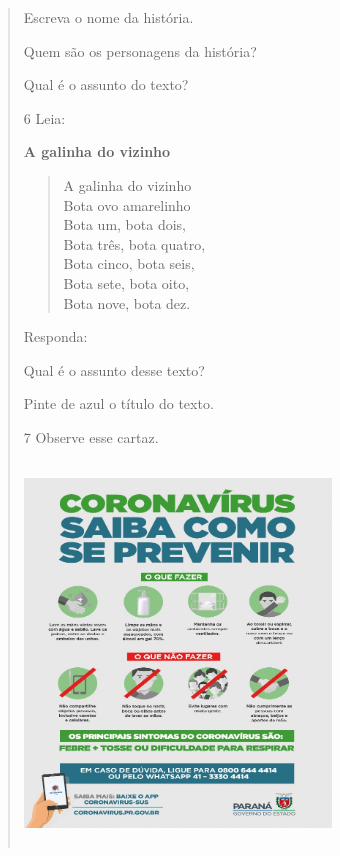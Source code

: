 \begin{verse}

\begin{escolha}
\item Escreva o nome da história.


\item Quem são os personagens da história?


\item Qual é o assunto do texto?

\end{escolha}

\num{6} Leia:

\textbf{A galinha do vizinho}

\begin{verse}
A galinha do vizinho\\
Bota ovo amarelinho\\
Bota um, bota dois,\\
Bota três, bota quatro,\\
Bota cinco, bota seis,\\
Bota sete, bota oito,\\
Bota nove, bota dez.
\end{verse}

Responda:

\begin{escolha}
\item Qual é o assunto desse texto?


\item Pinte de azul o título do texto.
\end{escolha}

\num{7} Observe esse cartaz.


\includegraphics[width=3.20896in,height=3.98057in]{media/image120.jpeg}


\end{verse}
